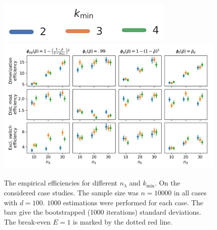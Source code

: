\begin{figure}[htb]
    \centering    
    \includegraphics[scale=.55]{gfx/legend.pdf}\\
    \includegraphics[scale=.4]{gfx/efficiency_pminfrac.pdf}
	\caption[Varying redundancy heuristics and $k_{\min}$]{The empirical efficiencies for different $n_\lambda$ and $k_{\min}$.
	On the considered case studies. The sample size was $n=\num{10000}$ in all cases
    with $d=100$.
	$\num{1000}$ estimations were performed for each case.
    The bars give the 
	bootstrapped (\num{1000} iterations) standard deviations.
    The break-even $E=1$ is marked by the dotted red line.\label{fig:efficiencies_alg_params}}
\end{figure}



